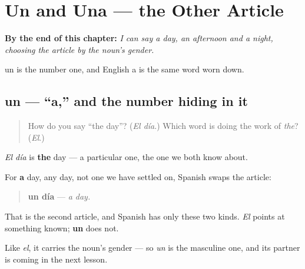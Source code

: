 
\chapter{Un and Una --- the Other Article}
\label{ch:spanish-indefinite-article}

\begin{chapteropening}
\textbf{By the end of this chapter:} \emph{I can say a day, an afternoon and a night, choosing the article by the noun's gender.}

un is the number one, and English a is the same word worn down.
\end{chapteropening}

\section[un]{un — \textquotedblleft{}a,\textquotedblright{} and the number hiding in it}

\label{lesson:ES-C02-un}



\begin{quote}
How do you say \textquotedblleft{}the day\textquotedblright{}? (\emph{El día}.) Which word is doing the work of \emph{the}? (\emph{El}.)
\end{quote}

\begin{grammarlens}[title={Grammar Lens: the other article}]
\emph{El día} is \textbf{the} day — a particular one, the one we both know about.

For \textbf{a} day, any day, not one we have settled on, Spanish swaps the article:

\begin{quote}
\textbf{un día} — \emph{a day.}
\end{quote}

That is the second article, and Spanish has only these two kinds. \emph{El} points at something known; \textbf{un} does not.

Like \emph{el}, it carries the noun's gender — so \emph{un} is the masculine one, and its partner is coming in the next lesson.
\end{grammarlens}

